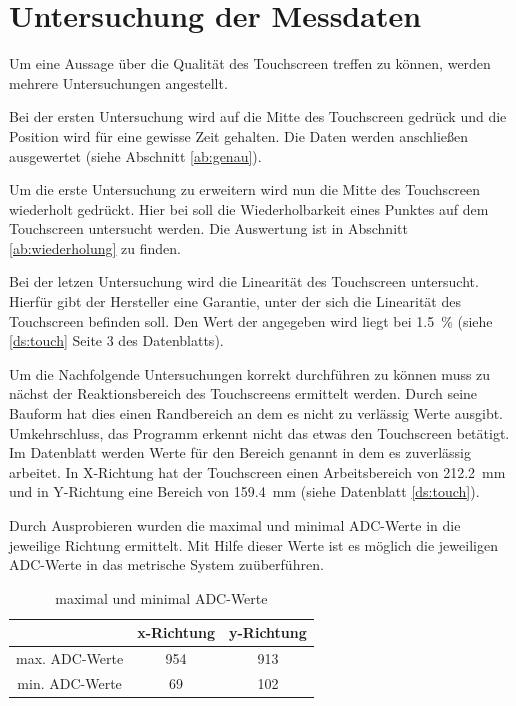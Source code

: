 \chapter{Untersuchung der Messdaten}
Um eine Aussage über die Qualität des Touchscreen treffen zu können, werden mehrere Untersuchungen angestellt. 

Bei der ersten Untersuchung wird auf die Mitte des Touchscreen gedrück und die Position wird für eine gewisse Zeit gehalten.
Die Daten werden anschließen ausgewertet (siehe Abschnitt \ref{ab:genau}).

Um die erste Untersuchung zu erweitern wird nun die Mitte des Touchscreen wiederholt gedrückt. Hier bei soll die Wiederholbarkeit eines Punktes auf dem Touchscreen untersucht werden. 
Die Auswertung ist in Abschnitt \ref{ab:wiederholung} zu finden.

Bei der letzen Untersuchung wird die Linearität des Touchscreen untersucht. Hierfür gibt der Hersteller eine Garantie, unter der sich die Linearität des Touchscreen befinden soll. 
Den Wert der angegeben wird liegt bei \SI{1,5}{\%} (siehe \ref{ds:touch} Seite 3 des Datenblatts).

Um die Nachfolgende Untersuchungen korrekt durchführen zu können muss zu nächst der Reaktionsbereich des Touchscreens ermittelt werden.
Durch seine Bauform hat dies einen Randbereich an dem es nicht zu verlässig Werte ausgibt. Umkehrschluss, das Programm erkennt nicht das etwas den Touchscreen betätigt. 
Im Datenblatt werden Werte für den Bereich genannt in dem es zuverlässig arbeitet. In X-Richtung hat der Touchscreen einen Arbeitsbereich von \SI{212,2}{mm} und in Y-Richtung eine Bereich von \SI{159,4}{mm} (siehe Datenblatt \ref{ds:touch}).

Durch Ausprobieren wurden die maximal und minimal ADC-Werte in die jeweilige Richtung ermittelt. Mit Hilfe dieser Werte ist es möglich die jeweiligen ADC-Werte in das metrische System zuüberführen.
\begin{table}[ht!]
    \caption{maximal und minimal ADC-Werte}
    \begin{center}
        \begin{tabular}{ c |c| c }
            
                & x-Richtung & y-Richtung \\ \hline
         max. ADC-Werte & 954 & 913 \\  \hline
         min. ADC-Werte& 69 & 102 \\   
        \end{tabular}
    \end{center}   
\end{table}

